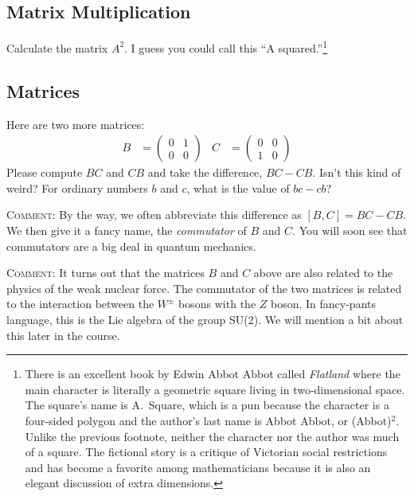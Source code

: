 \documentclass[12pt]{article}
\newcommand\acro[1]{{\small {#1}}}
\numberwithin{equation}{section}    %
\begin{document}
\subsection{Matrix Multiplication}

Calculate the matrix $A^2$. I guess you could call this ``A squared.''\footnote{There is an excellent book by Edwin Abbot Abbot called \emph{Flatland} where the main character is literally a geometric square living in two-dimensional space. The square's name is A.~Square, which is a pun because the character is a four-sided polygon and the author's last name is Abbot Abbot, or (Abbot)$^2$. Unlike the previous footnote, neither the character nor the author was much of a square. The fictional story is a critique of Victorian social restrictions and has become a favorite among mathematicians because it is also an elegant discussion of extra dimensions.}

\subsection{Matrices}

Here are two more matrices:
\begin{align}
	B &= 
	\begin{pmatrix}
		0 & 1 \\
		0 & 0
	\end{pmatrix}
	&
	C &= 
	\begin{pmatrix}
		0 & 0 \\
		1 & 0
	\end{pmatrix}
\end{align}
Please compute $BC$ and $CB$ and take the difference, $BC-CB$. Isn't this kind of weird? For ordinary numbers $b$ and $c$, what is the value of $bc-cb$?

{\small
\textsc{Comment:} By the way, we often abbreviate this difference as $[B,C] = BC-CB$. We then give it a fancy name, the \emph{commutator} of $B$ and $C$. You will soon see that commutators are a big deal in quantum mechanics. 

\textsc{Comment:} It turns out that the matrices $B$ and $C$ above are also related to the physics of the weak nuclear force. The commutator of the two matrices is related to the interaction between the $W^\pm$ bosons with the $Z$ boson. In fancy-pants language, this is the Lie algebra of the group \acro{SU(2)}. We will mention a bit about this later in the course.} 
\end{document}
